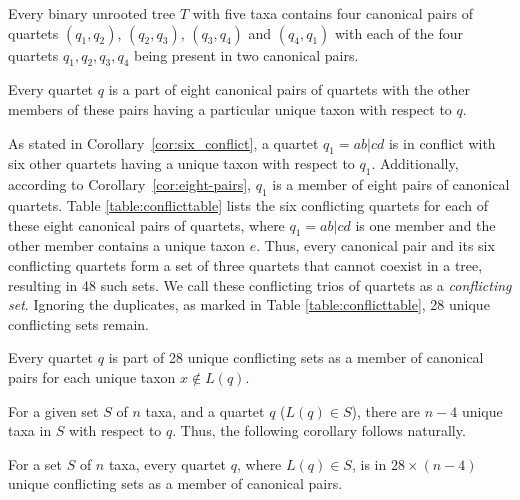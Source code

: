 \documentclass[runningheads]{llncs}
\begin{document}
\begin{appendices}
\begin{corollary}
\label{cor:two-pair-quartets}
 
Every binary unrooted tree $T$ with five taxa contains four canonical pairs of quartets $(q_1,q_2)$, $(q_2,q_3)$, $(q_3,q_4)$ and $(q_4,q_1)$ with each of the four quartets $q_1, q_2, q_3, q_4$ being present in two canonical pairs. 
\end{corollary}

\begin{corollary}
\label{cor:eight-pairs}
Every quartet $q$ is a part of eight canonical pairs of quartets with the other members of these pairs having a particular unique taxon with respect to $q$. 
\end{corollary}


As stated in Corollary~\ref{cor:six_conflict}, a quartet $q_1 = ab|cd$ is in conflict with six other quartets having a unique taxon with respect to $q_1$. Additionally, according to Corollary~\ref{cor:eight-pairs}, $q_1$ is a member of eight pairs of canonical quartets. Table \ref{table:conflicttable} lists the six conflicting quartets for each of these eight canonical pairs of quartets, where $q_1=ab|cd$ is one member and the other member contains a unique taxon $e$. Thus, every canonical pair and its six conflicting quartets form a set of three quartets that cannot coexist in a tree, resulting in 48 such sets. We call these conflicting trios of quartets as a \textit{conflicting set}. Ignoring the duplicates, as marked in Table \ref{table:conflicttable}, 28 unique conflicting sets remain.



\vspace{-3em}
\begin{corollary}
\label{cor:unique-conflict}
Every quartet $q$ is part of 28 unique conflicting sets as a member of canonical pairs for each unique taxon $x \notin L(q) $.
\end{corollary}

For a given set $S$ of $n$ taxa, and a quartet $q$ ($L(q) \in S$), there are $n-4$ unique taxa in $S$ with respect to $q$. Thus, the following corollary follows naturally.

\begin{corollary}
\label{cor:total_unique_conflict}
For a set $S$ of $n$ taxa, every quartet $q$, where $L(q) \in S$, is in $28 \times (n-4)$ unique conflicting sets as a member of canonical pairs.
\end{corollary}


\end{appendices}
\end{document}
